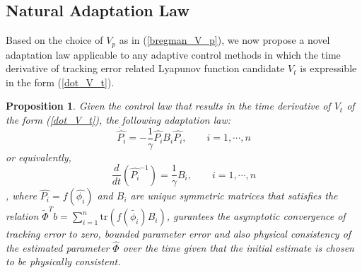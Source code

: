 \documentclass[Afour,sageh,times]{sagej}
\newtheorem{proposition}{Proposition}
\begin{document}
\subsection{Natural Adaptation Law}
Based on the choice of $V_{p}$ as in (\ref{bregman_V_p}), we now propose a novel adaptation law applicable to any adaptive control methods in which the time derivative of tracking error related Lyapunov function candidate $V_{t}$ is expressible in the form (\ref{dot_V_t}).
\begin{proposition}
Given the control law that results in the time derivative of $V_{t}$ of the form (\ref{dot_V_t}), the following adaptation law:
\begin{equation}
\dot{\hat{P_i}} = -\frac{1}{\gamma}\hat{P_i} B_i \hat{P_i}, \qquad i = 1, \cdots, n \label{natural_adaptation_1}
\end{equation}
or equivalently,
\begin{equation}
\frac{d}{dt}(\hat{P_i}^{-1}) = \frac{1}{\gamma}B_i, \qquad i = 1, \cdots, n \label{natural_adaptation_2}
\end{equation}
, where $\hat{P_i} = f(\hat{\phi_i})$ and $B_i$ are unique symmetric matrices that satisfies the relation $\tilde{\Phi}^{T}b = \sum_{i=1}^n \mathrm{tr}(f(\tilde{\phi_i})B_i)$, gurantees the asymptotic convergence of tracking error to zero, bounded parameter error and also physical consistency of the estimated parameter $\hat{\Phi}$ over the time given that the initial estimate is chosen to be physically consistent.


\end{proposition}
\end{document}
